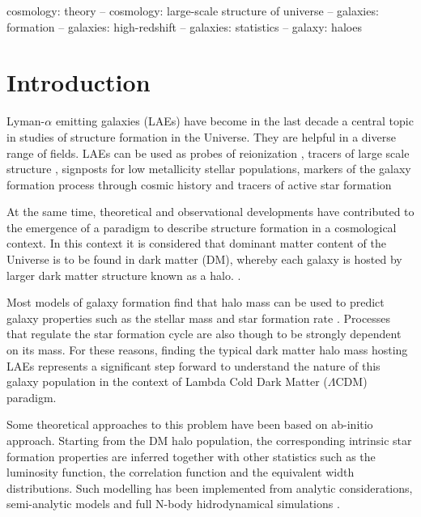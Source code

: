 \documentclass[usenatbib]{mn2e}
\begin{document}
\begin{keywords}
{cosmology: theory – cosmology: large-scale structure of universe –
  galaxies: formation – galaxies: high-redshift – galaxies: statistics
  – galaxy: haloes} 
\end{keywords}


\section{Introduction}

Lyman-$\alpha$ emitting galaxies (LAEs) have become in the last decade
a  central topic in studies of structure formation in the Universe. They 
are helpful in a diverse range of fields. LAEs can be used as probes
of reionization \citep{Dijkstra11}, tracers of large scale structure
\citep{Koehler2007},  signposts for low metallicity stellar
populations, markers of the galaxy formation process through
cosmic history \citep{ForeroRomero2012} and tracers of active star
formation  \citep{Guaita2013}

At the same time, theoretical and observational developments have
contributed to the emergence of a paradigm to describe structure
formation in a cosmological context. In this context it is considered
that dominant matter content of the Universe is to be found in dark
matter (DM), whereby each galaxy is hosted by larger dark matter structure
known as a halo. \citep{Peebles1980,SpringelNature05}.

Most models of galaxy formation find that halo mass can be
used to predict galaxy properties such as the stellar mass and
star formation rate \citep{Behroozi2012}. Processes that regulate the
star formation cycle are also though to be strongly dependent on its
mass.  For these reasons, finding the typical dark matter halo mass
hosting LAEs represents a significant step forward to understand the
nature of this galaxy population in the context of Lambda Cold Dark
Matter ($\Lambda$CDM) paradigm.    

Some theoretical approaches to this problem have been based on
ab-initio approach. Starting from the DM halo population, the
corresponding intrinsic star formation properties are inferred
together with other statistics such as the luminosity function, the
correlation function and the equivalent width distributions. Such
modelling has been implemented from analytic considerations,
semi-analytic models  and  full N-body hidrodynamical simulations
\citep{Laursen2007, Dayal2009, ForeroRomero2011, Yajima2012, Orsi2012,
  Soler2012}.  
\end{document}
